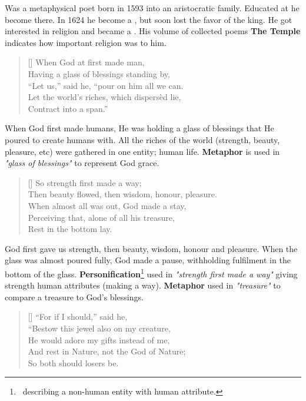 
Was a metaphysical poet born in 1593 into an aristocratic family. Educated at
 he become 
 there. In 1624 he become a ,
but soon lost the favor of the king. He got interested in religion and became a .
His volume of collected poems \textbf{The Temple} indicates how important religion was to him.

\settowidth{\versewidth}{Having a glass of blessings standing by "let"}
\begin{verse}[\versewidth]
{\fontverse
When God at first made man,\\
Having a glass of blessings standing by,\\
“Let us,” said he, “pour on him all we can.\\
Let the world’s riches, which dispersèd lie,\\
Contract into a span.”
} 
\end{verse}

When God first made humans, He was holding a glass of blessings that
He poured to create humans with. All the riches of the world (strength, beauty, pleasure, etc) were gathered in 
one entity; human life. \textbf{Metaphor} is used in \textit{"glass of blessings"} to represent God grace.

\begin{verse}[\versewidth]
{\fontverse
So strength first made a way;\\
Then beauty flowed, then wisdom, honour, pleasure.\\
When almost all was out, God made a stay,\\
Perceiving that, alone of all his treasure,\\
Rest in the bottom lay.
} 
\end{verse}

God first gave us strength, then beauty, wisdom, honour and pleasure.
When the glass was almost poured fully, God made a pause, withholding 
fulfilment in the bottom of the glass. \textbf{Personification}\footnote{\,
describing a non-human entity with human attribute.}
used in \textit{"strength first made a way"} giving strength human attributes
(making a way). \textbf{Metaphor} used in \textit{"treasure"} to compare
a treasure to God's blessings.

\newpage
\begin{verse}[\versewidth]
{\fontverse
“For if I should,” said he,\\
“Bestow this jewel also on my creature,\\
He would adore my gifts instead of me,\\
And rest in Nature, not the God of Nature;\\
So both should losers be.
} 
\end{verse}

